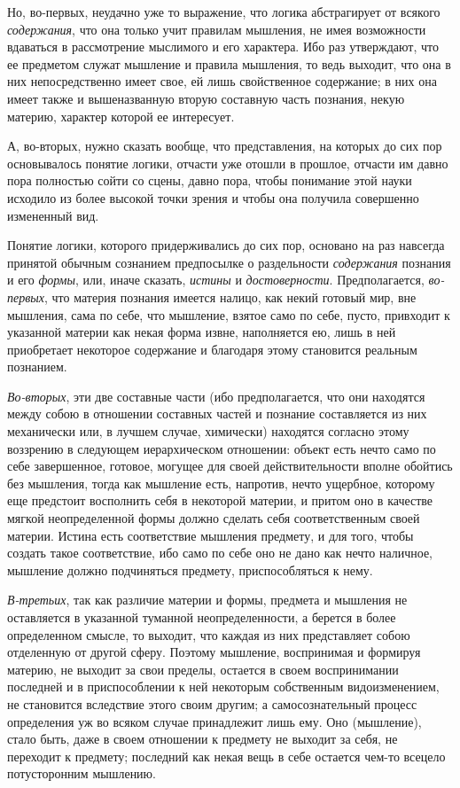 Но, во-первых, неудачно уже то выражение, что логика абстрагирует от всякого
{\em содержания}, что она только учит правилам
мышления, не имея возможности вдаваться в рассмотрение мыслимого и его
характера. Ибо раз утверждают, что ее предметом служат мышление и правила
мышления, то ведь выходит, что она в них непосредственно имеет свое, ей
лишь свойственное содержание; в них она имеет также и вышеназванную вторую
составную часть познания, некую материю, характер которой ее интересует.

А, во-вторых, нужно сказать вообще, что представления, на которых до сих пор
основывалось понятие логики, отчасти уже отошли в прошлое, отчасти им давно
пора полностью сойти со сцены, давно пора, чтобы понимание этой науки
исходило из более высокой точки зрения и чтобы она получила совершенно
измененный вид.

Понятие логики, которого придерживались до сих пор, основано на раз навсегда
принятой обычным сознанием предпосылке о раздельности {\em содержания}
познания и его {\em формы}, или, иначе сказать, {\em истины} и
{\em достоверности}. Предполагается, {\em во-первых}, что материя познания
имеется налицо, как некий готовый мир, вне мышления, сама по себе, что
мышление, взятое само по себе, пусто, привходит к указанной материи как
некая форма извне, наполняется ею, лишь в ней приобретает некоторое
содержание и благодаря этому становится реальным познанием.

{\em Во-вторых}, эти две составные части (ибо
предполагается, что они находятся между собою в отношении составных частей
и познание составляется из них механически или, в лучшем случае, химически)
находятся согласно этому воззрению в следующем иерархическом отношении:
объект есть нечто само по себе завершенное, готовое, могущее для своей
действительности вполне обойтись без мышления, тогда как мышление есть,
напротив, нечто ущербное, которому еще предстоит восполнить себя в
некоторой материи, и притом оно в качестве мягкой неопределенной формы
должно сделать себя соответственным своей материи. Истина есть соответствие
мышления предмету, и для того, чтобы создать такое соответствие, ибо само
по себе оно не дано как нечто наличное, мышление должно подчиняться
предмету, приспособляться к нему.

{\em В-третьих}, так как различие материи и формы,
предмета и мышления не оставляется в указанной туманной неопределенности, а
берется в более определенном смысле, то выходит, что каждая из них
представляет собою отделенную от другой сферу. Поэтому мышление,
воспринимая и формируя материю, не выходит за свои пределы, остается в
своем воспринимании последней и в приспособлении к ней некоторым
собственным видоизменением, не становится вследствие этого своим другим; а
самосознательный процесс определения уж во всяком случае принадлежит лишь
ему. Оно (мышление), стало быть, даже в своем отношении к предмету не
выходит за себя, не переходит к предмету; последний как некая вещь в себе
остается чем-то всецело потусторонним мышлению.

